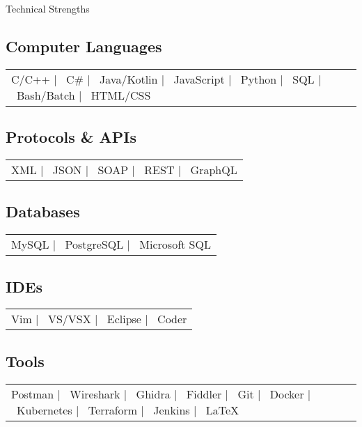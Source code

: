 \documentclass[
	11pt, %
]{crumpcv} %
\begin{document}
\begin{rSection}{Technical Strengths}

\newcommand{\sep}{ | }

\subsection*{Computer Languages}
\begin{tabular}{@{} p{} @{}}
    C/C++ \sep\ C\# \sep\ Java/Kotlin \sep\ JavaScript \sep\ Python \sep\ SQL \sep\ Bash/Batch \sep\ HTML/CSS
\end{tabular}

\vspace{1em}

\subsection*{Protocols \& APIs}
\begin{tabular}{@{} p{} @{}}
    XML \sep\ JSON \sep\ SOAP \sep\ REST \sep\ GraphQL
\end{tabular}

\vspace{1em}

\subsection*{Databases}
\begin{tabular}{@{} p{} @{}}
    MySQL \sep\ PostgreSQL \sep\ Microsoft SQL
\end{tabular}

\vspace{1em}

\subsection*{IDEs}
\begin{tabular}{@{} p{} @{}}
    Vim \sep\ VS/VSX \sep\ Eclipse \sep\ Coder
\end{tabular}

\vspace{1em}

\subsection*{Tools}
\begin{tabular}{@{} p{} @{}}
    Postman \sep\ Wireshark \sep\ Ghidra \sep\ Fiddler \sep\ Git \sep\ Docker \sep\ Kubernetes \sep\ Terraform \sep\ Jenkins \sep\ LaTeX
\end{tabular}


\end{rSection}
\end{document}
